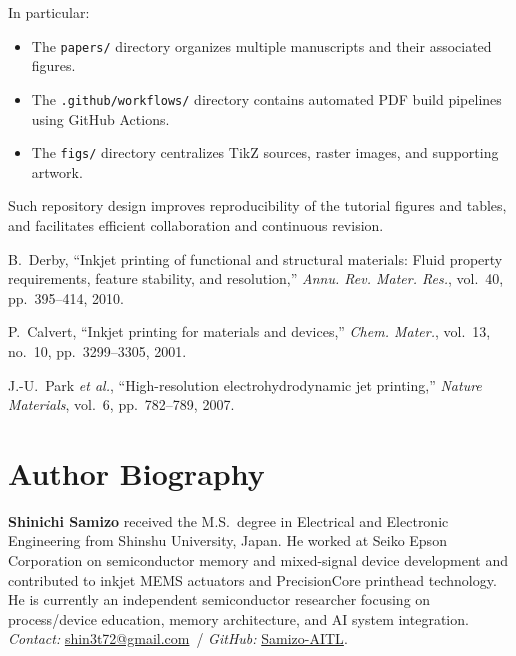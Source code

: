 \documentclass[conference]{IEEEtran}
\begin{document}
In particular:
\begin{itemize}
  \item The \texttt{papers/} directory organizes multiple manuscripts and 
        their associated figures.
  \item The \texttt{.github/workflows/} directory contains automated 
        PDF build pipelines using GitHub Actions.
  \item The \texttt{figs/} directory centralizes TikZ sources, raster 
        images, and supporting artwork.
\end{itemize}

Such repository design improves reproducibility of the tutorial figures 
and tables, and facilitates efficient collaboration and continuous 
revision.


\begin{thebibliography}{99}
B.~Derby, ``Inkjet printing of functional and structural materials: Fluid property requirements, feature stability, and resolution,'' \emph{Annu. Rev. Mater. Res.}, vol.~40, pp.~395--414, 2010.

P.~Calvert, ``Inkjet printing for materials and devices,'' \emph{Chem. Mater.}, vol.~13, no.~10, pp.~3299--3305, 2001.

J.-U.~Park \emph{et al.}, ``High-resolution electrohydrodynamic jet printing,'' \emph{Nature Materials}, vol.~6, pp.~782--789, 2007.
\end{thebibliography}

\section*{Author Biography}
\textbf{Shinichi Samizo} received the M.S.\ degree in Electrical and Electronic Engineering from Shinshu University, Japan. He worked at Seiko Epson Corporation on semiconductor memory and mixed-signal device development and contributed to inkjet MEMS actuators and PrecisionCore printhead technology. He is currently an independent semiconductor researcher focusing on process/device education, memory architecture, and AI system integration. \emph{Contact:} \href{mailto:shin3t72@gmail.com}{shin3t72@gmail.com}\, / \emph{GitHub:} \href{https://github.com/Samizo-AITL}{Samizo-AITL}.
\end{document}
